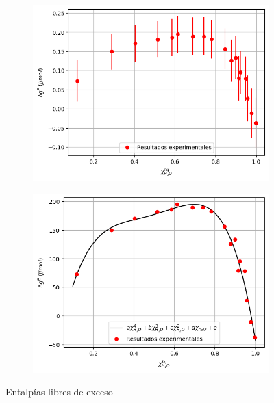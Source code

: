 \documentclass[a4paper,12pt,titlepage]{article}
\begin{document}
\begin{figure}[h!]
    \centering
    \begin{subfigure}{0.49\textwidth}
        \centering
        \includegraphics[width=1.\linewidth]{ELV binario/entalpia_inc.png}
    \end{subfigure}
    \begin{subfigure}{0.49\textwidth}
        \centering
        \includegraphics[width=1.05\linewidth]{ELV binario/entalpia.png}
    \end{subfigure}
    \caption{Entalpías libres de exceso}
    \label{fig:enter-label}
\end{figure}
\end{document}
